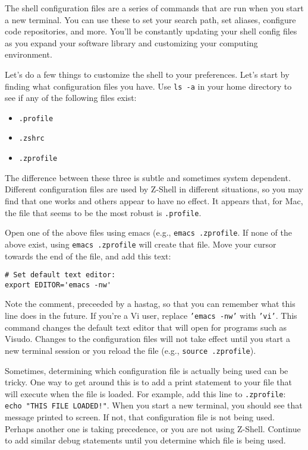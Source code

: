 \documentclass[12pt, letterpaper]{article}
\begin{document}
The shell configuration files are a series of commands that are run when you
start a new terminal.  You can use these to set your search path, set aliases,
configure code repositories, and more.  You'll be constantly updating your
shell config files as you expand your software library and customizing your
computing environment.

Let's do a few things to customize the shell to your preferences.  Let's start
by finding what configuration files you have.  Use {\tt ls -a} in your home
directory to see if any of the following files exist:
\begin{itemize}
\item {\tt .profile}
\item {\tt .zshrc}
\item {\tt .zprofile}
\end{itemize}

The difference between these three is subtle and sometimes system dependent.
Different configuration files are used by Z-Shell in different situations, so
you may find that one works and others appear to have no effect.
It appears that, for Mac, the file that seems to be the most robust is
{\tt .profile}.

Open one of the above files using emacs (e.g., {\tt emacs .zprofile}.  If
none of the above exist, using {\tt emacs .zprofile} will create that file.
Move your cursor towards the end of the file, and add this text:
\begin{verbatim}
# Set default text editor:
export EDITOR='emacs -nw'
\end{verbatim}
Note the comment, preceeded by a hastag, so that you can remember what this
line does in the future.
If you're a Vi user, replace {\tt 'emacs -nw'} with {\tt 'vi'}.  This command
changes the default text editor that will open for programs such as
Visudo.
Changes to the configuration files will not take effect until you start a
new terminal session or you reload the file (e.g., {\tt source .zprofile}).

Sometimes, determining which configuration file is actually being used can
be tricky. One way to get around this is to add a print statement to your file
that will execute when the file is loaded. For example, add this line to
{\tt .zprofile}: {\tt echo "THIS FILE LOADED!"}. When you start a new
terminal, you should see that message printed to screen. If not, that
configuration file is not being used. Perhaps another one is taking precedence,
or you are not using Z-Shell. Continue to add similar debug statements until
you determine which file is being used.
\end{document}
